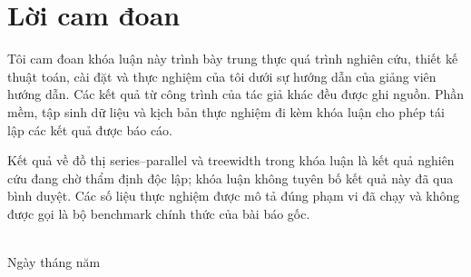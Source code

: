 \chapter*{Lời cam đoan}

Tôi cam đoan khóa luận này trình bày trung thực quá trình nghiên cứu, thiết kế thuật toán, cài đặt và thực nghiệm của tôi dưới sự hướng dẫn của giảng viên hướng dẫn. Các kết quả từ công trình của tác giả khác đều được ghi nguồn. Phần mềm, tập sinh dữ liệu và kịch bản thực nghiệm đi kèm khóa luận cho phép tái lập các kết quả được báo cáo.

Kết quả về đồ thị series--parallel và treewidth trong khóa luận là kết quả nghiên cứu đang chờ thẩm định độc lập; khóa luận không tuyên bố kết quả này đã qua bình duyệt. Các số liệu thực nghiệm được mô tả đúng phạm vi đã chạy và không được gọi là bộ benchmark chính thức của bài báo gốc.

\vspace{2cm}
\begin{flushright}
\StudentName\\
Ngày \dotfill tháng \dotfill năm \ThesisYear
\end{flushright}

